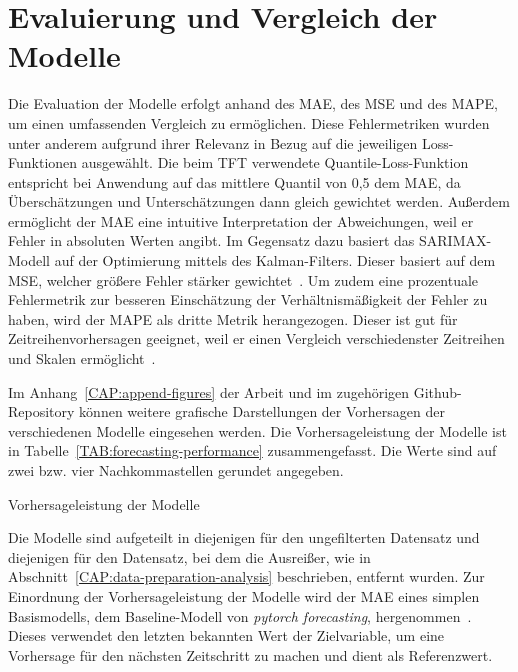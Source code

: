 \section{Evaluierung und Vergleich der Modelle}
Die Evaluation der Modelle erfolgt anhand des \ac{MAE}, des \ac{MSE} und des \ac{MAPE}, um einen umfassenden Vergleich zu ermöglichen.
Diese Fehlermetriken wurden unter anderem aufgrund ihrer Relevanz in Bezug auf die jeweiligen Loss-Funktionen ausgewählt.
Die beim \ac{TFT} verwendete Quantile-Loss-Funktion entspricht bei Anwendung auf das mittlere Quantil von 0,5 dem \ac{MAE}, da Überschätzungen und Unterschätzungen dann gleich gewichtet werden.
Außerdem ermöglicht der \ac{MAE} eine intuitive Interpretation der Abweichungen, weil er Fehler in absoluten Werten angibt.
Im Gegensatz dazu basiert das \ac{SARIMAX}-Modell auf der Optimierung mittels des Kalman-Filters.
Dieser basiert auf dem \ac{MSE}, welcher größere Fehler stärker gewichtet~\cite{Lacey.1998}.
Um zudem eine prozentuale Fehlermetrik zur besseren Einschätzung der Verhältnismäßigkeit der Fehler zu haben, wird der \ac{MAPE} als dritte Metrik herangezogen.
Dieser ist gut für Zeitreihenvorhersagen geeignet, weil er einen Vergleich verschiedenster Zeitreihen und Skalen ermöglicht~\cite{Lazzeri.2021}.

Im Anhang~\ref{CAP:append-figures} der Arbeit und im zugehörigen Github-Repository können weitere grafische Darstellungen der Vorhersagen der verschiedenen Modelle eingesehen werden.
Die Vorhersageleistung der Modelle ist in Tabelle~\ref{TAB:forecasting-performance} zusammengefasst.
Die Werte sind auf zwei bzw. vier Nachkommastellen gerundet angegeben.
\begin{table}[htbp]
 \centering
 \caption{Vorhersageleistung der Modelle}
 \label{TAB:forecasting-performance}
 
\end{table}
Die Modelle sind aufgeteilt in diejenigen für den ungefilterten Datensatz und diejenigen für den Datensatz, bei dem die Ausreißer, wie in Abschnitt~\ref{CAP:data-preparation-analysis} beschrieben, entfernt wurden.
Zur Einordnung der Vorhersageleistung der Modelle wird der \ac{MAE} eines simplen Basismodells, dem Baseline-Modell von \textit{pytorch forecasting}, hergenommen~\cite{PytorchForecastingDocumentation.20230410T20:05:46.000Zb}.
Dieses verwendet den letzten bekannten Wert der Zielvariable, um eine Vorhersage für den nächsten Zeitschritt zu machen und dient als Referenzwert.

